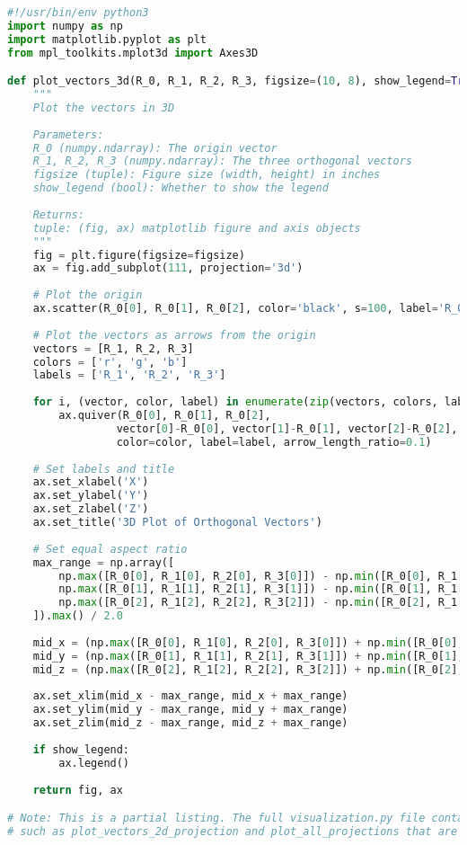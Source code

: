 \begin{lstlisting}[language=Python]
#!/usr/bin/env python3
import numpy as np
import matplotlib.pyplot as plt
from mpl_toolkits.mplot3d import Axes3D

def plot_vectors_3d(R_0, R_1, R_2, R_3, figsize=(10, 8), show_legend=True):
    """
    Plot the vectors in 3D
    
    Parameters:
    R_0 (numpy.ndarray): The origin vector
    R_1, R_2, R_3 (numpy.ndarray): The three orthogonal vectors
    figsize (tuple): Figure size (width, height) in inches
    show_legend (bool): Whether to show the legend
    
    Returns:
    tuple: (fig, ax) matplotlib figure and axis objects
    """
    fig = plt.figure(figsize=figsize)
    ax = fig.add_subplot(111, projection='3d')
    
    # Plot the origin
    ax.scatter(R_0[0], R_0[1], R_0[2], color='black', s=100, label='R_0')
    
    # Plot the vectors as arrows from the origin
    vectors = [R_1, R_2, R_3]
    colors = ['r', 'g', 'b']
    labels = ['R_1', 'R_2', 'R_3']
    
    for i, (vector, color, label) in enumerate(zip(vectors, colors, labels)):
        ax.quiver(R_0[0], R_0[1], R_0[2], 
                 vector[0]-R_0[0], vector[1]-R_0[1], vector[2]-R_0[2], 
                 color=color, label=label, arrow_length_ratio=0.1)
    
    # Set labels and title
    ax.set_xlabel('X')
    ax.set_ylabel('Y')
    ax.set_zlabel('Z')
    ax.set_title('3D Plot of Orthogonal Vectors')
    
    # Set equal aspect ratio
    max_range = np.array([
        np.max([R_0[0], R_1[0], R_2[0], R_3[0]]) - np.min([R_0[0], R_1[0], R_2[0], R_3[0]]),
        np.max([R_0[1], R_1[1], R_2[1], R_3[1]]) - np.min([R_0[1], R_1[1], R_2[1], R_3[1]]),
        np.max([R_0[2], R_1[2], R_2[2], R_3[2]]) - np.min([R_0[2], R_1[2], R_2[2], R_3[2]])
    ]).max() / 2.0
    
    mid_x = (np.max([R_0[0], R_1[0], R_2[0], R_3[0]]) + np.min([R_0[0], R_1[0], R_2[0], R_3[0]])) / 2
    mid_y = (np.max([R_0[1], R_1[1], R_2[1], R_3[1]]) + np.min([R_0[1], R_1[1], R_2[1], R_3[1]])) / 2
    mid_z = (np.max([R_0[2], R_1[2], R_2[2], R_3[2]]) + np.min([R_0[2], R_1[2], R_2[2], R_3[2]])) / 2
    
    ax.set_xlim(mid_x - max_range, mid_x + max_range)
    ax.set_ylim(mid_y - max_range, mid_y + max_range)
    ax.set_zlim(mid_z - max_range, mid_z + max_range)
    
    if show_legend:
        ax.legend()
    
    return fig, ax

# Note: This is a partial listing. The full visualization.py file contains additional functions
# such as plot_vectors_2d_projection and plot_all_projections that are omitted here for brevity.
\end{lstlisting}

